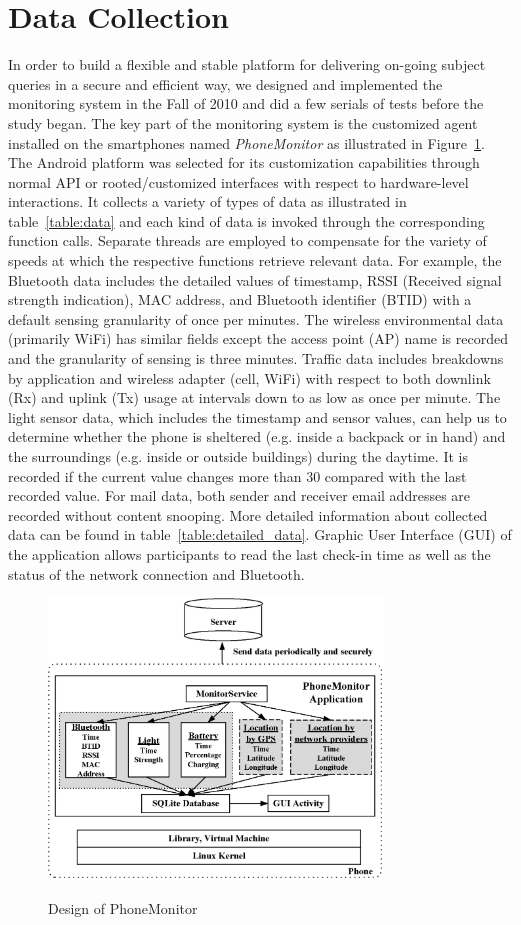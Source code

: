 \section{Data Collection}
In order to build a flexible and stable platform for delivering on-going subject queries in a secure and efficient way, we designed and implemented the monitoring system in the Fall of 2010 and did a few serials of tests before the study began. The key part of the monitoring system is the customized agent installed on the smartphones named \textit{PhoneMonitor} as illustrated in Figure~\ref{fig:agent}. The Android platform was selected for its customization capabilities through normal API or rooted/customized interfaces with respect to hardware-level interactions. It collects a variety of types of data as illustrated in table~\ref{table:data} and each kind of data is invoked through the corresponding function calls. Separate threads are employed to compensate for the variety of speeds at which the respective functions retrieve relevant data. For example, the Bluetooth data includes the detailed values of timestamp, RSSI (Received signal strength indication), MAC address, and Bluetooth identifier (BTID) with a default sensing granularity of once per minutes. The wireless environmental data (primarily WiFi) has similar fields except the access point (AP) name is recorded and the granularity of sensing is three minutes. Traffic data includes breakdowns by application and wireless adapter (cell, WiFi) with respect to both downlink (Rx) and uplink (Tx) usage at intervals down to as low as once per minute. The light sensor data, which includes the timestamp and sensor values, can help us to determine whether the phone is sheltered (e.g. inside a backpack or in hand) and the surroundings (e.g. inside or outside buildings) during the daytime. It is recorded if the current value changes more than 30 compared with the last recorded value. For mail data, both sender and receiver email addresses are recorded without content snooping. More detailed information about collected data can be found in table~\ref{table:detailed_data}. Graphic User Interface (GUI) of the application allows participants to read the last check-in time as well as the status of the network connection and Bluetooth. 

\begin{figure}[h!tbp]
\centering 
{\includegraphics[width=3.5in]{graphs/Figure1.eps}}
\caption{Design of PhoneMonitor} 
\label{fig:agent}
\end{figure} 

